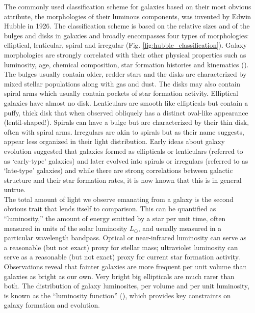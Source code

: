 The commonly used classification scheme for galaxies based on their most obvious attribute, the morphologies of their luminous components, was invented by Edwin Hubble in 1926. The classification scheme is based on the relative sizes and of the bulges and disks in galaxies and broadly encompasses four types of morphologies: elliptical, lenticular, spiral and irregular (Fig. \ref{fig:hubble_classification}). Galaxy morphologies are strongly correlated with their other physical properties such as luminosity, age, chemical composition, star formation histories and kinematics (\citealt{roberts94a}). The bulges usually contain older, redder stars and the disks are characterized by mixed stellar populations along with gas and dust. The disks may also contain spiral arms which usually contain pockets of star formation activity. Elliptical galaxies have almost no disk. Lenticulars are smooth like ellipticals but contain a puffy, thick disk that when observed obliquely has a distinct oval-like appearance (lentil-shaped!). Spirals can have a bulge but are characterized by their thin disk, often with spiral arms. Irregulars are akin to spirals but as their name suggests, appear less organized in their light distribution. Early ideas about galaxy evolution suggested that galaxies formed as ellipticals or lenticulars (referred to as `early-type' galaxies) and later evolved into spirals or irregulars (referred to as `late-type' galaxies) and while there are strong correlations between galactic structure and their star formation rates, it is now known that this is in general untrue.\\

The total amount of light we observe emanating from a galaxy is the
second obvious trait that lends itself to comparison. This can be
quantified as ``luminosity,'' the amount of energy emitted by a star
per unit time, often measured in units of the solar luminosity
$L_{\odot}$, and usually measured in a particular wavelength
bandpass. Optical or near-infrared luminosity can serve as a
reasonable (but not exact) proxy for stellar mass; ultraviolet
luminosity can serve as a reasonable (but not exact) proxy for
current star formation activity. Observations reveal that fainter
galaxies are more frequent per unit volume than galaxies as bright
as our own. Very bright big ellipticals are much rarer than both.
The distribution of galaxy luminosites, per volume and per unit
luminosity, is known as the ``luminosity function''
(\citet{1988MNRAS.232..431E, blanton05a}), which provides key
constraints on galaxy formation and evolution.


